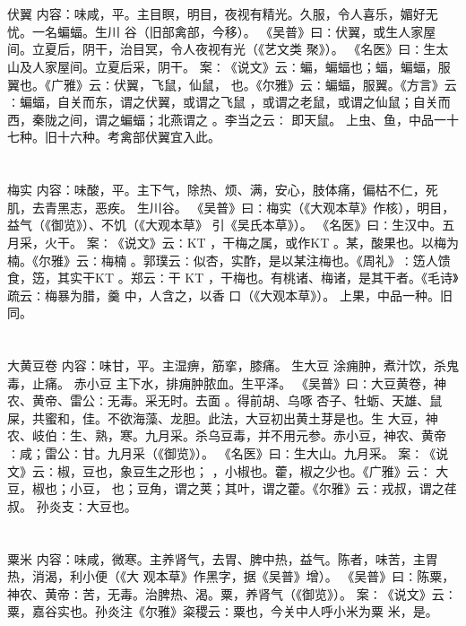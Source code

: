 \documentclass[12pt,UTF8]{ctexbook}
\begin{document}
\section{}伏翼
内容：味咸，平。主目瞑，明目，夜视有精光。久服，令人喜乐，媚好无忧。一名蝙蝠。生川 
谷（旧部禽部，今移）。 
《吴普》曰∶伏翼，或生人家屋间。立夏后，阴干，治目冥，令人夜视有光（《艺文类 
聚》）。 
《名医》曰∶生太山及人家屋间。立夏后采，阴干。 
案∶《说文》云∶蝙，蝙蝠也；蝠，蝙蝠，服翼也。《广雅》云∶伏翼，飞鼠，仙鼠， 
也。《尔雅》云∶蝙蝠，服翼。《方言》云∶蝙蝠，自关而东，谓之伏翼，或谓之飞鼠 
，或谓之老鼠，或谓之仙鼠；自关而西，秦陇之间，谓之蝙蝠；北燕谓之 。李当之云∶ 
即天鼠。 
上虫、鱼，中品一十七种。旧十六种。考禽部伏翼宜入此。 


\section{}梅实
内容：味酸，平。主下气，除热、烦、满，安心，肢体痛，偏枯不仁，死肌，去青黑志，恶疾。 
生川谷。 
《吴普》曰∶梅实（《大观本草》作核），明目，益气（《御览》）、不饥（《大观本草》 
引《吴氏本草》）。 
《名医》曰∶生汉中。五月采，火干。 
案∶《说文》云∶KT ，干梅之属，或作KT 。某，酸果也。以梅为楠。《尔雅》云∶梅楠 
。郭璞云∶似杏，实酢，是以某注梅也。《周礼》∶笾人馈食，笾，其实干KT 。郑云∶干 
KT 
，干梅也。有桃诸、梅诸，是其干者。《毛诗》疏云∶梅暴为腊，羹 中，人含之，以香 
口（《大观本草》）。 
上果，中品一种。旧同。 


\section{}大黄豆卷
内容：味甘，平。主湿痹，筋挛，膝痛。 
生大豆 涂痈肿，煮汁饮，杀鬼毒，止痛。 
赤小豆 主下水，排痈肿脓血。生平泽。 
《吴普》曰∶大豆黄卷，神农、黄帝、雷公∶无毒。采无时。去面 。得前胡、乌啄 
杏子、牡蛎、天雄、鼠屎，共蜜和，佳。不欲海藻、龙胆。此法，大豆初出黄土芽是也。生 
大豆，神农、岐伯∶生、熟，寒。九月采。杀乌豆毒，并不用元参。赤小豆，神农、黄帝 
∶咸；雷公∶甘。九月采（《御览》）。 
《名医》曰∶生大山。九月采。 
案∶《说文》云∶椒，豆也，象豆生之形也； ，小椒也。藿，椒之少也。《广雅》云∶ 
大豆，椒也；小豆， 也；豆角，谓之荚；其叶，谓之藿。《尔雅》云∶戎叔，谓之荏叔。 
孙炎支∶大豆也。 


\section{}粟米
内容：味咸，微寒。主养肾气，去胃、脾中热，益气。陈者，味苦，主胃热，消渴，利小便（《大 
观本草》作黑字，据《吴普》增）。 
《吴普》曰∶陈粟，神农、黄帝∶苦，无毒。治脾热、渴。粟，养肾气（《御览》）。 
案∶《说文》云∶粟，嘉谷实也。孙炎注《尔雅》粢稷云∶粟也，今关中人呼小米为粟 
米，是。 
\end{document}
